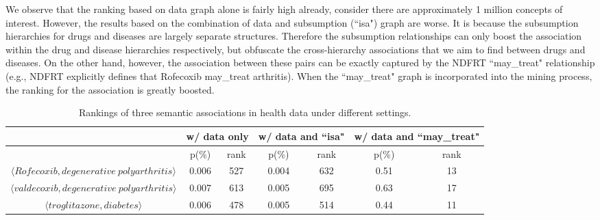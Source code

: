 We observe that the ranking based on data graph alone is fairly high already, consider there are approximately 1 million concepts of interest. However, the results based on the combination of data and subsumption (``isa") graph are worse. It is because the subsumption hierarchies for drugs and diseases are largely separate structures. Therefore the subsumption relationships can only boost the association within the drug and disease hierarchies respectively, but obfuscate the cross-hierarchy associations that we aim to find between drugs and diseases. On the other hand, however, the association between these pairs can be exactly captured by the NDFRT ``may\_treat" relationship (e.g., NDFRT explicitly defines that Rofecoxib may\_treat arthritis). When the ``may\_treat" graph is incorporated into the mining process, the ranking for the association is greatly boosted.

\begin{table}[tbh]\scriptsize
\begin{center}
\begin{tabular}{ c | c  c | c  c | c  c }
\hline
        &   \multicolumn{2}{c|}{w/ data only}  &   \multicolumn{2}{c|}{w/ data and ``isa"} & \multicolumn{2}{c}{w/ data and ``may\_treat"}\\
\hline
                        	&   p(\%)   &   rank    &   p(\%)    &   rank    &   p(\%)    &    rank    \\
\hline
$\langle Rofecoxib, degenerative~polyarthritis\rangle$  &   0.006   &   527     &   0.004    &   632     &   0.51     &     13     \\
$\langle valdecoxib, degenerative~polyarthritis\rangle$  &   0.007   &   613     &   0.005    &   695     &   0.63     &     17     \\
$\langle troglitazone, diabetes\rangle$  &   0.006   &   478     &   0.005    &   514     &   0.44     &     11     \\
\hline
\end{tabular}
\end{center}
\caption[Rankings of three semantic associations in health data under\protect\newline different settings]{\label{tbl:health_exp}Rankings of three semantic associations in health data under different settings.}
\end{table}





